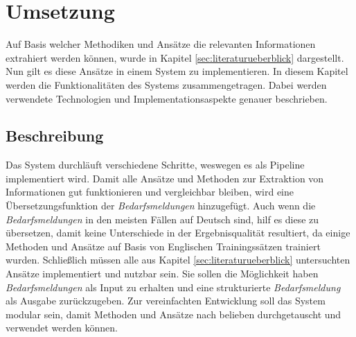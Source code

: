 \chapter{Umsetzung}
\label{chap:implementierung}
Auf Basis welcher Methodiken und Ansätze die relevanten Informationen extrahiert werden können, wurde in Kapitel \ref{sec:literaturueberblick} dargestellt. Nun gilt es diese Ansätze in einem System zu implementieren. In diesem Kapitel werden die Funktionalitäten des Systems zusammengetragen. Dabei werden verwendete Technologien und Implementationsaspekte genauer beschrieben.
\section{Beschreibung}
Das System durchläuft verschiedene Schritte, weswegen es als Pipeline implementiert wird. Damit alle Ansätze und Methoden zur Extraktion von Informationen gut funktionieren und vergleichbar bleiben, wird eine Übersetzungsfunktion der \emph{Bedarfsmeldungen} hinzugefügt. Auch wenn die \emph{Bedarfsmeldungen} in den meisten Fällen auf Deutsch sind, hilf es diese zu übersetzen, damit keine Unterschiede in der Ergebnisqualität resultiert, da einige Methoden und Ansätze auf Basis von Englischen Trainingssätzen trainiert wurden. Schließlich müssen alle aus Kapitel \ref{sec:literaturueberblick} untersuchten Ansätze implementiert und nutzbar sein. Sie sollen die Möglichkeit haben \emph{Bedarfsmeldungen} als Input zu erhalten und eine strukturierte \emph{Bedarfsmeldung} als Ausgabe zurückzugeben. Zur vereinfachten Entwicklung soll das System modular sein, damit Methoden und Ansätze nach belieben durchgetauscht und verwendet werden können.\\
